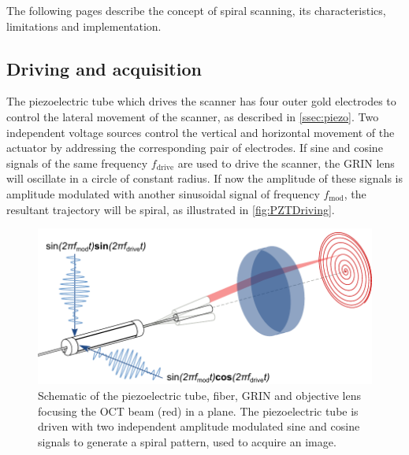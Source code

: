 The following pages describe the concept of spiral scanning, its characteristics, limitations and implementation.

\subsection{Driving and acquisition}
The piezoelectric tube which drives the scanner has four outer gold electrodes to control the lateral movement of the scanner, as described in \autoref{ssec:piezo}. Two independent voltage sources control the vertical and horizontal movement of the actuator by addressing the corresponding pair of electrodes. If sine and cosine signals of the same frequency $f_\mathrm{drive}$ are used to drive the scanner, the GRIN lens will oscillate in a circle of constant radius. If now the amplitude of these signals is amplitude modulated with another sinusoidal signal of frequency $f_\mathrm{mod}$, the resultant trajectory will be spiral, as illustrated in \autoref{fig:PZTDriving}.

\begin{figure}[h!]\centering \includegraphics{figures/30_DesignSimulation/spiralScanning/PZTDrivingMoving.pdf}
      \caption{Schematic of the piezoelectric tube, fiber, GRIN and objective lens focusing the OCT beam (red) in a plane. 
      The piezoelectric tube is driven with two independent amplitude modulated sine and cosine signals to generate a spiral pattern, used to acquire an image. }
      \label{fig:PZTDriving}
\end{figure}

